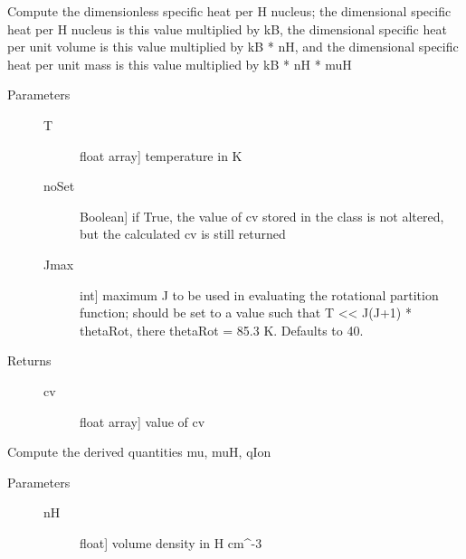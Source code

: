 \documentclass[letterpaper,10pt,english]{sphinxmanual}
\begin{document}
\begin{fulllineitems}
\begin{description}
\begin{description}
\end{description}

\end{description}

\begin{fulllineitems}
\label{fulldoc:despotic.composition.computeCv}
Compute the dimensionless specific heat per H nucleus; the
dimensional specific heat per H nucleus is this value
multiplied by kB, the dimensional specific heat per unit
volume is this value multiplied by kB * nH, and the
dimensional specific heat per unit mass is this value
multiplied by kB * nH * muH
\begin{description}
\item[{Parameters}] \leavevmode\begin{description}
\item[{T}] \leavevmode{[}float \textbar{} array{]}
temperature in K

\item[{noSet}] \leavevmode{[}Boolean{]}
if True, the value of cv stored in the class is not
altered, but the calculated cv is still returned

\item[{Jmax}] \leavevmode{[}int{]}
maximum J to be used in evaluating the rotational
partition function; should be set to a value such that T
\textless{}\textless{} J(J+1) * thetaRot, there thetaRot = 85.3 K. Defaults to
40.

\end{description}

\item[{Returns}] \leavevmode\begin{description}
\item[{cv}] \leavevmode{[}float \textbar{} array{]}
value of cv

\end{description}

\end{description}

\end{fulllineitems}


\begin{fulllineitems}
\label{fulldoc:despotic.composition.computeDerived}
Compute the derived quantities mu, muH, qIon
\begin{description}
\item[{Parameters}] \leavevmode\begin{description}
\item[{nH}] \leavevmode{[}float{]}
volume density in H cm\textasciicircum{}-3


\end{description}
\end{description}
\end{fulllineitems}
\end{fulllineitems}
\end{document}
